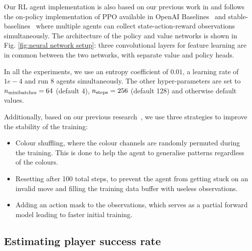 \documentclass[conference]{IEEEtran}
\begin{document}


Our RL agent implementation is also based on our previous work in \cite{Kristensen2020StrategiesGames} and follows the on-policy implementation of PPO available in OpenAI Baselines~\cite{openaiGYM} and stable-baselines~\cite{stable-baselines} where multiple agents can collect state-action-reward observations simultaneously.
The architecture of the policy and value networks is shown in Fig. \ref{fig:neural network setup}: three convolutional layers for feature learning are in common between the two networks, with separate value and policy heads.

In all the experiments, we use an entropy coefficient of $0.01$, a learning rate of $1e-4$ and run 8 agents simultaneously.
The other hyper-parameters are set to $n_{\textup{minibatches}} = 64$ (default 4), $n_{\textup{steps}} = 256$ (default 128) and otherwise default values.


Additionally, based on our previous research~\cite{Kristensen2020StrategiesGames}, we use three strategies to improve the stability of the training:
\begin{itemize}
    \item Colour shuffling, where the colour channels are randomly permuted during the training. This is done to help the agent to generalise patterns regardless of the colours.
    \item Resetting after 100 total steps, to prevent the agent from getting stuck on an invalid move and filling the training data buffer with useless observations.
    \item Adding an action mask to the observations, which serves as a partial forward model leading to  faster initial training.
\end{itemize}

\subsection{Estimating player success rate}
\label{subsec:method:difficulty evaluation}
\end{document}
